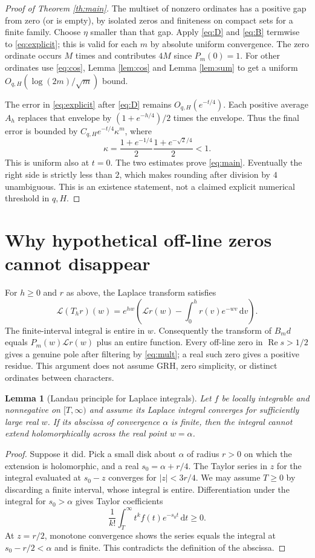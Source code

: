 \documentclass[11pt]{article}
\newtheorem{lemma}[theorem]{Lemma}
\theoremstyle{remark}\newtheorem{remark}[theorem]{Remark}
\newcommand{\Rea}{\operatorname{Re}}
\newcommand{\dd}{\,\mathrm d}
\begin{document}
\begin{proof}[Proof of Theorem \ref{th:main}]
The multiset of nonzero ordinates has a positive gap from zero (or is empty), by isolated zeros and finiteness on compact sets for a finite family. Choose $\eta$ smaller than that gap. Apply \eqref{eq:D} and \eqref{eq:B} termwise to \eqref{eq:explicit}; this is valid for each $m$ by absolute uniform convergence. The zero ordinate occurs $M$ times and contributes $4M$ since $P_m(0)=1$. For other ordinates use \eqref{eq:cos}, Lemma \ref{lem:cos} and Lemma \ref{lem:sum} to get a uniform $O_{q,H}(\log(2m)/\sqrt m)$ bound.

The error in \eqref{eq:explicit} after \eqref{eq:D} remains $O_{q,H}(e^{-t/4})$. Each positive average $A_h$ replaces that envelope by $(1+e^{-h/4})/2$ times the envelope. Thus the final error is bounded by $C_{q,H} e^{-t/4}\kappa^m$, where
\[
 \kappa=\frac{1+e^{-1/4}}2\frac{1+e^{-\sqrt2/4}}2<1.
\]
This is uniform also at $t=0$. The two estimates prove \eqref{eq:main}. Eventually the right side is strictly less than $2$, which makes rounding after division by $4$ unambiguous. This is an existence statement, not a claimed explicit numerical threshold in $q,H$.
\end{proof}

\section{Why hypothetical off-line zeros cannot disappear}
For $h\ge0$ and $r$ as above, the Laplace transform satisfies
\[
 \mathcal L(T_hr)(w)=e^{hw}\left(\mathcal Lr(w)-\int_0^h r(v)e^{-wv}\dd v\right).
\]
The finite-interval integral is entire in $w$. Consequently the transform of $B_md$ equals $P_m(w)\mathcal Lr(w)$ plus an entire function. Every off-line zero in $\Rea s>1/2$ gives a genuine pole after filtering by \eqref{eq:mult}; a real such zero gives a positive residue. This argument does not assume GRH, zero simplicity, or distinct ordinates between characters.

\begin{lemma}[Landau principle for Laplace integrals]\label{lem:landau}
Let $f$ be locally integrable and nonnegative on $[T,\infty)$ and assume its Laplace integral converges for sufficiently large real $w$. If its abscissa of convergence $\alpha$ is finite, then the integral cannot extend holomorphically across the real point $w=\alpha$.
\end{lemma}
\begin{proof}
Suppose it did. Pick a small disk about $\alpha$ of radius $r>0$ on which the extension is holomorphic, and a real $s_0=\alpha+r/4$. The Taylor series in $z$ for the integral evaluated at $s_0-z$ converges for $|z|<3r/4$. We may assume $T\ge0$ by discarding a finite interval, whose integral is entire. Differentiation under the integral for $s_0>\alpha$ gives Taylor coefficients
\[
 \frac1{k!}\int_T^\infty t^k f(t)e^{-s_0t}\dd t\ge0.
\]
At $z=r/2$, monotone convergence shows the series equals the integral at $s_0-r/2<\alpha$ and is finite. This contradicts the definition of the abscissa.
\end{proof}
\end{document}
